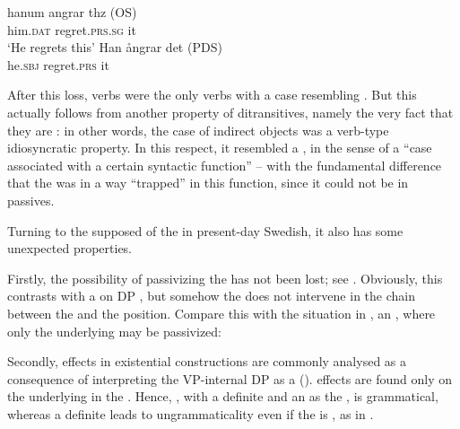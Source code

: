 \documentclass[output=paper]{langscibook}
\begin{document}
\ea%
    \label{ex:falk:5}
\ea
\gll hanum    angrar        thz    (OS)\\
      him.\textsc{dat} regret.\textsc{prs.sg}  it\\
\glt ‘He regrets this’
\ex
\gll Han    ångrar    det     (PDS)\\
      he.\textsc{sbj}  regret.\textsc{prs}  it\\
\z
\z

\begin{sloppypar}
After this loss,  verbs were the only verbs with a case resembling . But this actually follows from another property of ditransitives, namely the very fact that they are : in other words, the case of indirect objects was a verb-type idiosyncratic property. In this respect, it resembled a , in the sense of a “case associated with a certain syntactic function” – with the fundamental difference that the  was in a way “trapped” in this function, since it could not be  in passives.
\end{sloppypar}


Turning to the supposed  of the  in present-day Swedish, it also has some unexpected properties. 



Firstly, the possibility of passivizing the  has not been lost; see . Obviously, this contrasts with a  on DP , but somehow the  does not intervene in the chain between the  and the  position. Compare this with the situation in , an , where only the underlying  may be passivized:


\ea%
    \label{ex:falk:6}
\z
\z


Secondly,  effects in existential constructions are commonly analysed as a consequence of interpreting the VP-internal DP as a  ().  effects are found only on the underlying  in the . Hence, , with a definite  and an   as the , is grammatical, whereas a definite  leads to ungrammaticality even if the  is , as in .
\end{document}
